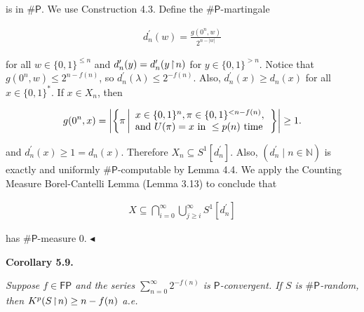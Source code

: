 \documentclass[10pt,a4paper]{article}
\begin{document}
is in ${\mathsf{\#}\mathsf{P}}$.
We use Construction 4.3.
Define the ${\mathsf{\#}\mathsf{P}}$-martingale\par


\[\begin{gathered}
d_{n}^{\prime}(w)=\frac{g(0^{n},w)}{2^{n-|w|}}
\end{gathered}\]


for all $w\in\{0,1\}^{\leq n}$ and $d_{n}^{\prime}(y)=d_{n}^{\prime}(y\negthinspace\upharpoonright\negthinspace n)$ for $y\in\{0,1\}^{>n}.$
Notice that $g(0^{n},w)\leq 2^{n-f(n)}$, so $d_{n}^{\prime}(\lambda)\leq 2^{-f(n)}$.
Also, $d_{n}^{\prime}(x)\geq d_{n}(x)$ for all $x\in\{0,1\}^{*}$.
If $x\in X_{n}$, then\par


\[\begin{gathered}
g(0^{n},x)=\left|\left\{\pi\left|\begin{array}[]{l}x\in\{0,1\}^{n},\pi\in\{0,1\}^{<n-f(n)},\\
\textrm{and }U(\pi)=x\textrm{ in }\leq p(n)\textrm{ time}\end{array}\right.\right\}\right|\geq 1.
\end{gathered}\]


and $d_{n}^{\prime}(x)\geq 1=d_{n}(x).$
Therefore
$X_{n}\subseteq S^{1}[d_{n}^{\prime}].$ Also, $(d_{n}^{\prime}\mid n\in\mathbb{N})$ is exactly and uniformly ${\mathsf{\#}\mathsf{P}}$-computable by Lemma 4.4.
We apply the Counting Measure
Borel-Cantelli Lemma (Lemma 3.13)
to conclude that\par


\[\begin{gathered}
X\subseteq\bigcap_{i=0}^{\infty}\bigcup_{j\geq i}^{\infty}S^{1}[d_{n}^{\prime}]
\end{gathered}\]


has ${\mathsf{\#}\mathsf{P}}$-measure 0.
$\blacktriangleleft$\par





\par\medskip\noindent\textbf{
\textbf{Corollary 5.9}\textbf{.}
}\par



\emph{Suppose $f\in\mathsf{FP}$ and the series $\sum\limits_{n=0}^{\infty}2^{-f(n)}$ is $\mathsf{P}$-convergent.
If $S$ is ${\mathsf{\#}\mathsf{P}}$-random, then $K^{p}(S\negthinspace\upharpoonright\negthinspace n)\geq n-f(n)$ a.e.}\par
\end{document}
